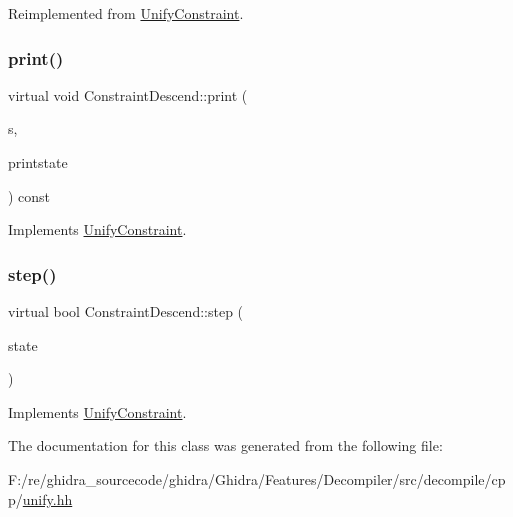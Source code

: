 Reimplemented from \mbox{\hyperlink{class_unify_constraint_ac812e2cf68c95e8a5c0e7e8ac02f2fc2}{Unify\+Constraint}}.

\mbox{\label{class_constraint_descend_af1530c37872173f7dfd608964c793a01}} 
\subsubsection{\texorpdfstring{print()}{print()}}
{\footnotesize\ttfamily virtual void Constraint\+Descend\+::print (\begin{DoxyParamCaption}\item[{ostream \&}]{s,  }\item[{\mbox{\hyperlink{class_unify_c_printer}{Unify\+C\+Printer}} \&}]{printstate }\end{DoxyParamCaption}) const\hspace{0.3cm}{\ttfamily [virtual]}}



Implements \mbox{\hyperlink{class_unify_constraint_a774f6a611a96384766cb8e8d8f5ff41f}{Unify\+Constraint}}.

\mbox{\label{class_constraint_descend_aa5b4c0fb09d4231c8ac20e95cfbaaae4}} 
\subsubsection{\texorpdfstring{step()}{step()}}
{\footnotesize\ttfamily virtual bool Constraint\+Descend\+::step (\begin{DoxyParamCaption}\item[{\mbox{\hyperlink{class_unify_state}{Unify\+State}} \&}]{state }\end{DoxyParamCaption})\hspace{0.3cm}{\ttfamily [virtual]}}



Implements \mbox{\hyperlink{class_unify_constraint_ad9ab4ad91037f96bf803735d414d212d}{Unify\+Constraint}}.



The documentation for this class was generated from the following file\+:\begin{DoxyCompactItemize}
\item 
F\+:/re/ghidra\+\_\+sourcecode/ghidra/\+Ghidra/\+Features/\+Decompiler/src/decompile/cpp/\mbox{\hyperlink{unify_8hh}{unify.\+hh}}\end{DoxyCompactItemize}
